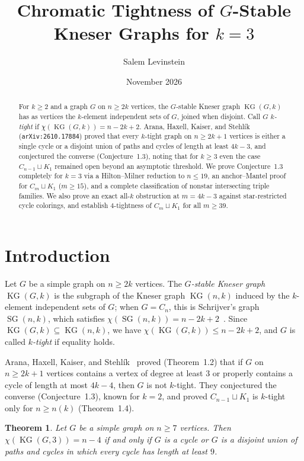\documentclass[11pt]{article}
\title{Chromatic Tightness of $G$-Stable Kneser Graphs for $k = 3$}
\author{Salem Levinstein}
\date{November 2026}
\newtheorem{theorem}{Theorem}[section]
\DeclareMathOperator{\KG}{KG}
\DeclareMathOperator{\SG}{SG}
\begin{document}
\maketitle

\begin{abstract}
For $k \ge 2$ and a graph $G$ on $n \ge 2k$ vertices, the $G$-stable Kneser graph $\KG(G, k)$ has as vertices the $k$-element independent sets of $G$, joined when disjoint. Call $G$ \emph{$k$-tight} if $\chi(\KG(G, k)) = n - 2k + 2$. Arana, Haxell, Kaiser, and Stehl\'ik (\texttt{arXiv:2610.17884}) proved that every $k$-tight graph on $n \ge 2k + 1$ vertices is either a single cycle or a disjoint union of paths and cycles of length at least $4k - 3$, and conjectured the converse (Conjecture~1.3), noting that for $k \ge 3$ even the case $C_{n-1} \sqcup K_1$ remained open beyond an asymptotic threshold. We prove Conjecture~1.3 completely for $k = 3$ via a Hilton--Milner reduction to $n \le 19$, an anchor--Mantel proof for $C_m \sqcup K_1$ ($m \ge 15$), and a complete classification of nonstar intersecting triple families. We also prove an exact all-$k$ obstruction at $m = 4k - 3$ against star-restricted cycle colorings, and establish $4$-tightness of $C_m \sqcup K_1$ for all $m \ge 39$.
\end{abstract}

\section{Introduction}

Let $G$ be a simple graph on $n \ge 2k$ vertices. The \emph{$G$-stable Kneser graph} $\KG(G, k)$ is the subgraph of the Kneser graph $\KG(n, k)$ induced by the $k$-element independent sets of $G$; when $G = C_n$, this is Schrijver's graph $\SG(n, k)$, which satisfies $\chi(\SG(n, k)) = n - 2k + 2$~\cite{Schrijver1978}. Since $\KG(G, k) \subseteq \KG(n, k)$, we have $\chi(\KG(G, k)) \le n - 2k + 2$, and $G$ is called \emph{$k$-tight} if equality holds.

Arana, Haxell, Kaiser, and Stehl\'ik~\cite{AHKS2026} proved (Theorem~1.2) that if $G$ on $n \ge 2k + 1$ vertices contains a vertex of degree at least $3$ or properly contains a cycle of length at most $4k - 4$, then $G$ is not $k$-tight. They conjectured the converse (Conjecture~1.3), known for $k = 2$, and proved $C_{n-1} \sqcup K_1$ is $k$-tight only for $n \ge n(k)$ (Theorem~1.4).

\begin{theorem}\label{thm:k3}
Let $G$ be a simple graph on $n \ge 7$ vertices. Then $\chi(\KG(G, 3)) = n - 4$ if and only if $G$ is a cycle or $G$ is a disjoint union of paths and cycles in which every cycle has length at least $9$.
\end{theorem}
\end{document}
